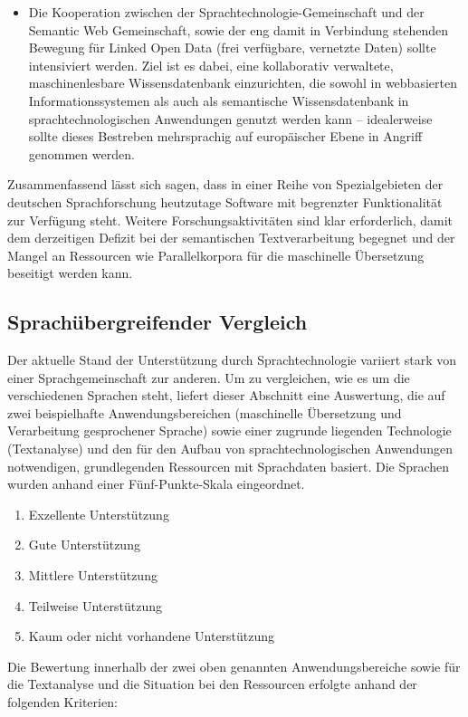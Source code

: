 \documentclass[]{../../metanetpaper}
\begin{document}
\begin{multicols}{2}
\begin{itemize}
\item Die Kooperation zwischen der Sprach\-tech\-no\-lo\-gie-Ge\-mein\-schaft und der Semantic Web Gemeinschaft, sowie der eng damit in Verbindung stehenden Bewegung für Linked Open Data (frei verfügbare, vernetzte Daten) sollte intensiviert werden. Ziel ist es dabei, eine kollaborativ verwaltete, maschinenlesbare Wissensdatenbank einzurichten, die sowohl in webbasierten Informationssystemen als auch als semantische Wissensdatenbank in sprachtechnologischen Anwendungen genutzt werden kann – idealerweise sollte dieses Bestreben mehrsprachig auf europäischer Ebene in Angriff genommen werden.	
\end{itemize}

Zusammenfassend lässt sich sagen, dass in einer Reihe von Spezialgebieten der deutschen Sprachforschung heutzutage Software mit begrenzter Funktionalität zur Verfügung steht. Weitere Forschungsaktivitäten sind klar erforderlich, damit dem derzeitigen Defizit bei der semantischen Textverarbeitung begegnet und der Mangel an Ressourcen wie Parallelkorpora für die maschinelle Übersetzung beseitigt werden kann.

\subsection{Sprachübergreifender Vergleich}

Der aktuelle Stand der Unterstützung durch Sprachtechnologie variiert stark von einer Sprachgemeinschaft zur anderen. Um zu vergleichen, wie es um die verschiedenen Sprachen steht, liefert dieser Abschnitt eine Auswertung, die auf zwei beispielhafte Anwendungsbereichen (maschinelle Übersetzung und Verarbeitung gesprochener Sprache) sowie einer zugrunde liegenden Technologie (Textanalyse) und den für den Aufbau von sprachtechnologischen Anwendungen notwendigen, grundlegenden Ressourcen mit Sprachdaten basiert. Die Sprachen wurden anhand einer Fünf-Punkte-Skala eingeordnet.

\begin{enumerate}
\item Exzellente Unterstützung
\item Gute Unterstützung
\item Mittlere Unterstützung
\item Teilweise Unterstützung
\item Kaum oder nicht vorhandene Unterstützung
\end{enumerate}

Die Bewertung innerhalb der zwei oben genannten Anwendungsbereiche sowie für die Textanalyse und die Situation bei den Ressourcen erfolgte anhand der folgenden Kriterien:


\end{multicols}
\end{document}
